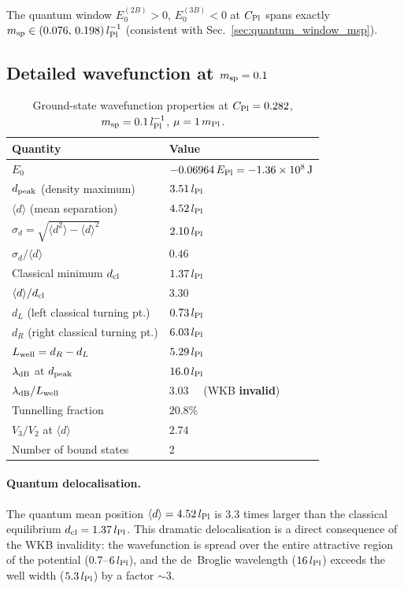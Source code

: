 \noindent
The quantum window $E_0^{(2B)}>0$, $E_0^{(3B)}<0$ at $C_{\rm Pl}$ spans
exactly $m_{\rm sp}\in(0.076,\,0.198)\,l_{\rm Pl}^{-1}$ (consistent with
Sec.~\ref{sec:quantum_window_msp}).

\subsection{Detailed wavefunction at \texorpdfstring{$m_{\rm sp}=0.1$}{m\_sp=0.1}}

\begin{table}[h]
\centering
\caption{Ground-state wavefunction properties at $C_{\rm Pl}=0.282$,
$m_{\rm sp}=0.1\,l_{\rm Pl}^{-1}$, $\mu=1\,m_{\rm Pl}$.}
\label{tab:psi0_detail}
\begin{tabular}{ll}
\hline
Quantity & Value \\
\hline
$E_0$ & $-0.06964\,E_{\rm Pl} = -1.36\times10^8\,\text{J}$ \\
$d_{\rm peak}$ (density maximum) & $3.51\,l_{\rm Pl}$ \\
$\langle d\rangle$ (mean separation) & $4.52\,l_{\rm Pl}$ \\
$\sigma_d = \sqrt{\langle d^2\rangle-\langle d\rangle^2}$ & $2.10\,l_{\rm Pl}$ \\
$\sigma_d/\langle d\rangle$ & $0.46$ \\
Classical minimum $d_{\rm cl}$ & $1.37\,l_{\rm Pl}$ \\
$\langle d\rangle/d_{\rm cl}$ & $3.30$ \\
$d_L$ (left classical turning pt.) & $0.73\,l_{\rm Pl}$ \\
$d_R$ (right classical turning pt.) & $6.03\,l_{\rm Pl}$ \\
$L_{\rm well} = d_R - d_L$ & $5.29\,l_{\rm Pl}$ \\
$\lambda_{\rm dB}$ at $d_{\rm peak}$ & $16.0\,l_{\rm Pl}$ \\
$\lambda_{\rm dB}/L_{\rm well}$ & $3.03$ \ \ (WKB \textbf{invalid}) \\
Tunnelling fraction & $20.8\%$ \\
$V_3/V_2$ at $\langle d\rangle$ & $2.74$ \\
Number of bound states & 2 \\
\hline
\end{tabular}
\end{table}

\paragraph{Quantum delocalisation.}
The quantum mean position $\langle d\rangle=4.52\,l_{\rm Pl}$ is $3.3$
times larger than the classical equilibrium $d_{\rm cl}=1.37\,l_{\rm Pl}$.
This dramatic delocalisation is a direct consequence of the WKB
invalidity: the wavefunction is spread over the entire attractive region
of the potential ($0.7$--$6\,l_{\rm Pl}$), and the
de~Broglie wavelength ($16\,l_{\rm Pl}$) exceeds the well width
($5.3\,l_{\rm Pl}$) by a factor $\sim3$.

